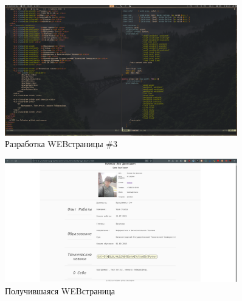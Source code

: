 \documentclass[14pt]{extarticle}
\begin{document}
\begin{figure}[h]
    \centering
	\includegraphics[width=0.9\textwidth, angle=0]{ 2021-12-12-16-25-53.png }
    \caption{Разработка WEB\-страницы \#3}
    \label{fig:html3}
\end{figure}

\begin{figure}[h]
    \centering
	\includegraphics[width=0.9\textwidth, angle=0]{2021-12-12_16-43}
    \caption{Получившаяся WEB\-страница}
    \label{fig:html4}
\end{figure}
\end{document}
